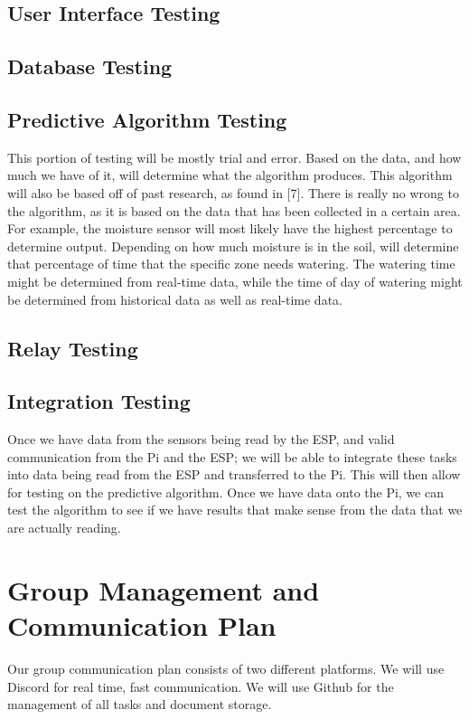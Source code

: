 \documentclass[letterpaper, 10 pt, conference]{ieeeconf}  %
\begin{document}
\subsection{User Interface Testing}

\subsection{Database Testing}

\subsection{Predictive Algorithm Testing}
This portion of testing will be mostly trial and error. Based on the data, and how much we have of it, will determine what the algorithm produces. This algorithm will also be based off of past research, as found in [7]. There is really no wrong to the algorithm, as it is based on the data that has been collected in a certain area. For example, the moisture sensor will most likely have the highest percentage to determine output. Depending on how much moisture is in the soil, will determine that percentage of time that the specific zone needs watering. The watering time might be determined from real-time data, while the time of day of watering might be determined from historical data as well as real-time data. 

\subsection{Relay Testing}

\subsection{Integration Testing}
Once we have data from the sensors being read by the ESP, and valid communication from the Pi and the ESP; we will be able to integrate these tasks into data being read from the ESP and transferred to the Pi. This will then allow for testing on the predictive algorithm. Once we have data onto the Pi, we can test the algorithm to see if we have results that make sense from the data that we are actually reading. 

\section{Group Management and Communication Plan}
Our group communication plan consists of two different platforms. We will use Discord for real time, fast communication. We will use Github for the management of all tasks and document storage. 
\end{document}
